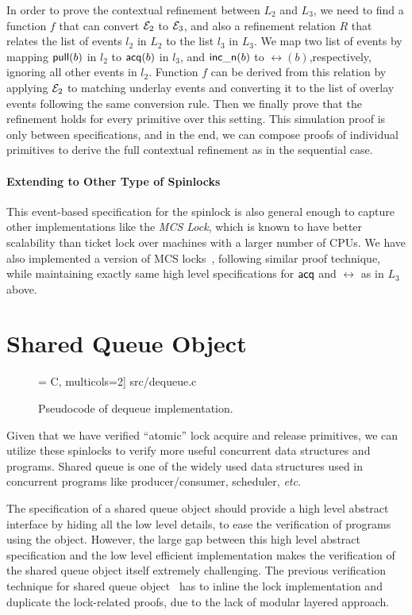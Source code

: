 In order to prove the contextual refinement between $L_2$ and $L_3$, we
need to find a function $f$ that can convert $\mathcal{E}_2$ to $\mathcal{E}_3$,
and also a refinement relation $R$ that 
relates the list of events $l_2$ in $L_2$ to the list $l_3$ in $L_3$.
We map two list of events by mapping $\mathsf{pull}(b)$ in $l_2$ to $\mathsf{acq}(b)$
in $l_3$, and $\mathsf{\textcolor{black}{inc\_n}}(b)$ to $\rel(b)$,respectively, ignoring all other
events in $l_2$. Function $f$ can be derived from this relation by
applying $\mathcal{E}_2$ to matching underlay events and converting it to
the list of overlay events following the same conversion rule.
Then we finally prove that the refinement holds for every primitive
over this setting.
This simulation proof is only between specifications, and in the end,
we can compose proofs of individual primitives to derive the full
contextual refinement as in the sequential case.

\paragraph{Extending to Other Type of Spinlocks}
This event-based specification for the spinlock is also general enough
to capture  other implementations like the \emph{MCS Lock},
which is known to have better scalability than ticket lock
over machines with a larger number of CPUs. We have also
implemented a version of MCS locks~\cite{kim2017safety}, following
similar proof technique, while maintaining exactly same high level
specifications for $\mathsf{acq}$ and $\rel$ as in $L_3$ above.


\section{Shared Queue Object}

\begin{figure}[t]
 = C, multicols=2] {src/dequeue.c}
\caption{Pseudocode of dequeue implementation.}
\label{fig:exp:dequeue}
\end{figure}

Given that we have verified ``atomic'' lock acquire and release primitives,
we can utilize these spinlocks to verify more useful concurrent
data structures and programs. Shared queue is one of the widely used
data structures used in concurrent programs like producer/consumer,
scheduler, {\it etc}. 

The specification of a shared queue object should provide a high level abstract
interface by hiding all the low level details,
to ease the verification of programs using the object.
However, the large gap between this high level abstract specification
and the low level efficient implementation makes the verification of the shared queue object
itself extremely challenging.
The previous verification technique for shared queue object~\cite{lili16}
has to inline the lock implementation and duplicate the lock-related proofs, due
to the lack of modular layered approach.

